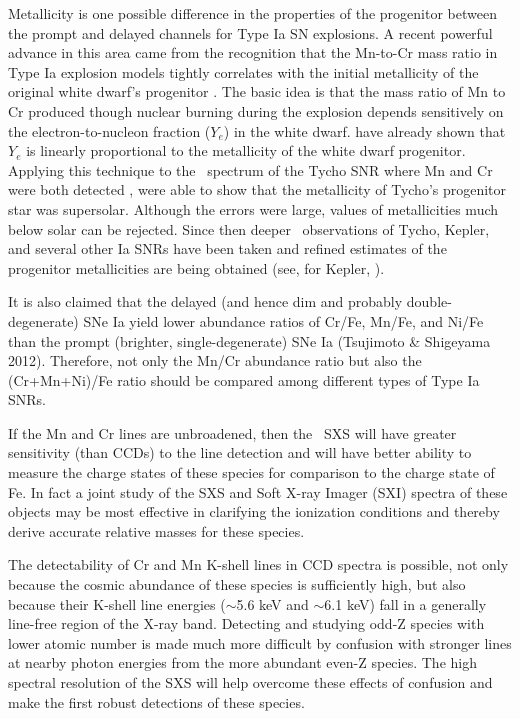 \documentclass[11pt,a4paper]{article}
\begin{document}
Metallicity is one possible difference in the properties of the
progenitor between the prompt and delayed channels for Type Ia SN
explosions.  A recent powerful advance in this area came from the
recognition that the Mn-to-Cr mass ratio in Type Ia explosion models
tightly correlates with the initial metallicity of the original white
dwarf's progenitor \citep{badenes08b}.  The basic idea is that the
mass ratio of Mn to Cr produced though nuclear burning during the
explosion depends sensitively on the electron-to-nucleon fraction
($Y_e$) in the white dwarf.  \citet{timmes03} have already shown that
$Y_e$ is linearly proportional to the metallicity of the white dwarf
progenitor.  Applying this technique to the \suzaku\ spectrum of the
Tycho SNR where Mn and Cr were both detected \citep{tamagawa09},
\citet{badenes08b} were able to show that the metallicity of Tycho's
progenitor star was supersolar.  Although the errors were large,
values of metallicities much below solar can be rejected.  Since then
deeper \suzaku\ observations of Tycho, Kepler, and several other Ia
SNRs have been taken and refined estimates of the progenitor
metallicities are being obtained (see, for Kepler,
\citealt{parkkepler13}).

It is also claimed that the delayed (and hence dim and probably
double-degenerate) SNe Ia yield lower abundance ratios of Cr/Fe,
Mn/Fe, and Ni/Fe than the prompt (brighter, single-degenerate) SNe Ia
(Tsujimoto \& Shigeyama 2012). Therefore, not only the Mn/Cr abundance
ratio but also the (Cr+Mn+Ni)/Fe ratio should be compared among
different types of Type Ia SNRs.

If the Mn and Cr lines are unbroadened, then the \ah\ SXS will have
greater sensitivity (than CCDs) to the line detection and will have
better ability to measure the charge states of these species for
comparison to the charge state of Fe.  In fact a joint study of the
SXS and Soft X-ray Imager (SXI) spectra of these objects may be most effective in
clarifying the ionization conditions and thereby derive accurate
relative masses for these species. 



The detectability of Cr and Mn K-shell lines in CCD spectra is
possible, not only because the cosmic abundance of these species is
sufficiently high, but also because their K-shell line energies
($\sim$5.6 keV and $\sim$6.1 keV) fall in a generally line-free region
of the X-ray band.  Detecting and studying odd-Z species with lower
atomic number is made much more difficult by confusion with stronger
lines at nearby photon energies from the more abundant even-Z species.
The high spectral resolution of the SXS will help overcome
these effects of confusion and make the first robust detections of
these species.
\end{document}
